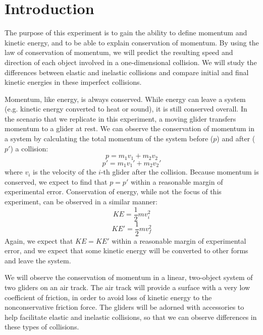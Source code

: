 \section*{Introduction}

The purpose of this experiment is to gain the ability to define momentum and kinetic energy, and to be able to explain conservation of momentum. By using the law of conservation of momentum, we will predict the resulting speed and direction of each object involved in a one-dimensional collision. We will study the differences between elastic and inelastic collisions and compare initial and final kinetic energies in these imperfect collisions.

\bigskip

Momentum, like energy, is always conserved. While energy can leave a system (e.g. kinetic energy converted to heat or sound), it is still conserved overall. In the scenario that we replicate in this experiment, a moving glider transfers momentum to a glider at rest. We can observe the conservation of momentum in a system by calculating the total momentum of the system before ($p$) and after ($p'$) a collision:
\[ p = m_{1}v_{1} + m_{2}v_{2} \]
\[ p' = m_{1}v_{1}' + m_{2}v_{2}' \]
where $v_i$ is the velocity of the $i$-th glider after the collision. Because momentum is conserved, we expect to find that $p=p'$ within a reasonable margin of experimental error. Conservation of energy, while not the focus of this experiment, can be observed in a similar manner:
\[ KE = \frac{1}{2} mv_{i}^{2} \]
\[ KE' = \frac{1}{2} mv_{f}^{2} \]
Again, we expect that $KE=KE'$ within a reasonable margin of experimental error, and we expect that some kinetic energy will be converted to other forms and leave the system.

\bigskip

We will observe the conservation of momentum in a linear, two-object system of two gliders on an air track. The air track will provide a surface with a very low coefficient of friction, in order to avoid loss of kinetic energy to the nonconservative friction force. The gliders will be adorned with accessories to help facilitate elastic and inelastic collisions, so that we can observe differences in these types of collisions.
